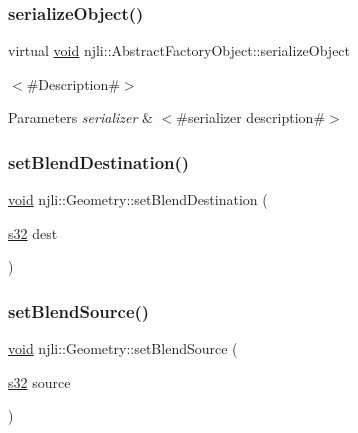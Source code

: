 \subsubsection{\texorpdfstring{serialize\+Object()}{serializeObject()}}
{\footnotesize\ttfamily virtual \mbox{\hyperlink{_thread_8h_af1e856da2e658414cb2456cb6f7ebc66}{void}} njli\+::\+Abstract\+Factory\+Object\+::serialize\+Object}

$<$\#\+Description\#$>$


\begin{DoxyParams}{Parameters}
{\em serializer} & $<$\#serializer description\#$>$ \\
\hline
\end{DoxyParams}
\mbox{\label{classnjli_1_1_geometry_ac8524641c3a7273902e2028ef6836503}} 
\subsubsection{\texorpdfstring{set\+Blend\+Destination()}{setBlendDestination()}}
{\footnotesize\ttfamily \mbox{\hyperlink{_thread_8h_af1e856da2e658414cb2456cb6f7ebc66}{void}} njli\+::\+Geometry\+::set\+Blend\+Destination (\begin{DoxyParamCaption}\item[{\mbox{\hyperlink{_util_8h_aa62c75d314a0d1f37f79c4b73b2292e2}{s32}}}]{dest }\end{DoxyParamCaption})}

\mbox{\label{classnjli_1_1_geometry_a52a0a0310a248e03f8b6c410ca0f3fae}} 
\subsubsection{\texorpdfstring{set\+Blend\+Source()}{setBlendSource()}}
{\footnotesize\ttfamily \mbox{\hyperlink{_thread_8h_af1e856da2e658414cb2456cb6f7ebc66}{void}} njli\+::\+Geometry\+::set\+Blend\+Source (\begin{DoxyParamCaption}\item[{\mbox{\hyperlink{_util_8h_aa62c75d314a0d1f37f79c4b73b2292e2}{s32}}}]{source }\end{DoxyParamCaption})}

